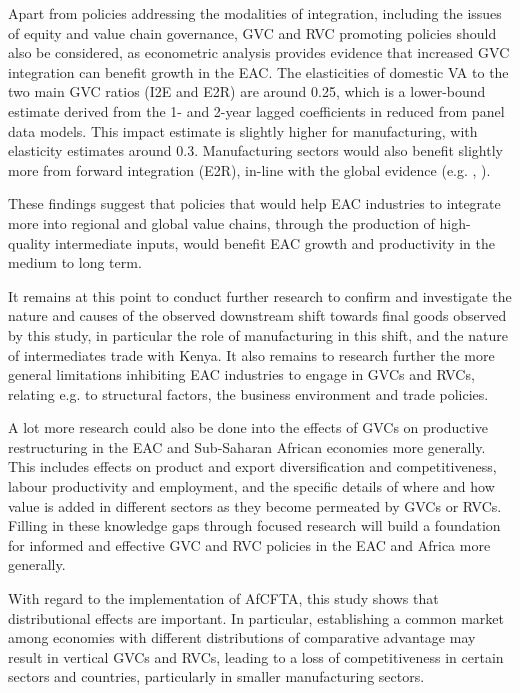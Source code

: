 \documentclass[a4paper]{article}
\begin{document}
Apart from policies addressing the modalities of integration, including the issues of equity and value chain governance, GVC and RVC promoting policies should also be considered, as econometric analysis provides evidence that increased GVC integration can benefit growth in the EAC. The elasticities of domestic VA to the two main GVC ratios  (I2E and E2R) are around 0.25, which is a lower-bound estimate derived from the 1- and 2-year lagged coefficients in reduced from panel data models.  This impact estimate is slightly higher for manufacturing, with elasticity estimates around 0.3. Manufacturing sectors would also benefit slightly more from forward integration (E2R), in-line with the global evidence (e.g.  \citet{Kummritz20161}, \citet{kummritz2015global}). \newline

These findings suggest that policies that would help EAC industries to integrate more into regional and global value chains, through the production of high-quality intermediate inputs, would benefit EAC growth and productivity in the medium to long term. \newline 

It remains at this point to conduct further research to confirm and investigate the nature and causes of the observed downstream shift towards final goods observed by this study, in particular the role of manufacturing in this shift, and the nature of intermediates trade with Kenya. It also remains to research further the more general limitations inhibiting EAC industries to engage in GVCs and RVCs, relating e.g. to structural factors, the business environment and trade policies. \newline

A lot more research could also be done into the effects of GVCs on productive restructuring in the EAC and Sub-Saharan African economies more generally. This includes effects on product and export diversification and competitiveness, labour productivity and employment, and the specific details of where and how value is added in different sectors as they become permeated by GVCs or RVCs. Filling in these knowledge gaps through focused research will build a foundation for informed and effective GVC and RVC policies in the EAC and Africa more generally. \newline

With regard to the implementation of AfCFTA, this study shows that distributional effects are important. In particular, establishing a common market among economies with different distributions of comparative advantage may result in vertical GVCs and RVCs, leading to a loss of competitiveness in certain sectors and countries, particularly in smaller manufacturing sectors. 
\end{document}
